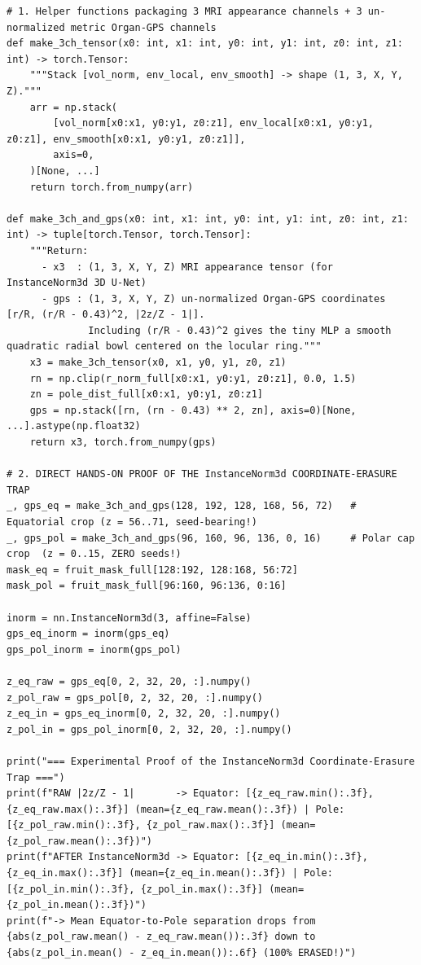 \documentclass[10pt,a4paper]{article}
\begin{document}
\begin{codebox}
\begin{lstlisting}[style=pybmed]
# 1. Helper functions packaging 3 MRI appearance channels + 3 un-normalized metric Organ-GPS channels
def make_3ch_tensor(x0: int, x1: int, y0: int, y1: int, z0: int, z1: int) -> torch.Tensor:
    """Stack [vol_norm, env_local, env_smooth] -> shape (1, 3, X, Y, Z)."""
    arr = np.stack(
        [vol_norm[x0:x1, y0:y1, z0:z1], env_local[x0:x1, y0:y1, z0:z1], env_smooth[x0:x1, y0:y1, z0:z1]],
        axis=0,
    )[None, ...]
    return torch.from_numpy(arr)

def make_3ch_and_gps(x0: int, x1: int, y0: int, y1: int, z0: int, z1: int) -> tuple[torch.Tensor, torch.Tensor]:
    """Return:
      - x3  : (1, 3, X, Y, Z) MRI appearance tensor (for InstanceNorm3d 3D U-Net)
      - gps : (1, 3, X, Y, Z) un-normalized Organ-GPS coordinates [r/R, (r/R - 0.43)^2, |2z/Z - 1|].
              Including (r/R - 0.43)^2 gives the tiny MLP a smooth quadratic radial bowl centered on the locular ring."""
    x3 = make_3ch_tensor(x0, x1, y0, y1, z0, z1)
    rn = np.clip(r_norm_full[x0:x1, y0:y1, z0:z1], 0.0, 1.5)
    zn = pole_dist_full[x0:x1, y0:y1, z0:z1]
    gps = np.stack([rn, (rn - 0.43) ** 2, zn], axis=0)[None, ...].astype(np.float32)
    return x3, torch.from_numpy(gps)

# 2. DIRECT HANDS-ON PROOF OF THE InstanceNorm3d COORDINATE-ERASURE TRAP
_, gps_eq = make_3ch_and_gps(128, 192, 128, 168, 56, 72)   # Equatorial crop (z = 56..71, seed-bearing!)
_, gps_pol = make_3ch_and_gps(96, 160, 96, 136, 0, 16)     # Polar cap crop  (z = 0..15, ZERO seeds!)
mask_eq = fruit_mask_full[128:192, 128:168, 56:72]
mask_pol = fruit_mask_full[96:160, 96:136, 0:16]

inorm = nn.InstanceNorm3d(3, affine=False)
gps_eq_inorm = inorm(gps_eq)
gps_pol_inorm = inorm(gps_pol)

z_eq_raw = gps_eq[0, 2, 32, 20, :].numpy()
z_pol_raw = gps_pol[0, 2, 32, 20, :].numpy()
z_eq_in = gps_eq_inorm[0, 2, 32, 20, :].numpy()
z_pol_in = gps_pol_inorm[0, 2, 32, 20, :].numpy()

print("=== Experimental Proof of the InstanceNorm3d Coordinate-Erasure Trap ===")
print(f"RAW |2z/Z - 1|       -> Equator: [{z_eq_raw.min():.3f}, {z_eq_raw.max():.3f}] (mean={z_eq_raw.mean():.3f}) | Pole: [{z_pol_raw.min():.3f}, {z_pol_raw.max():.3f}] (mean={z_pol_raw.mean():.3f})")
print(f"AFTER InstanceNorm3d -> Equator: [{z_eq_in.min():.3f}, {z_eq_in.max():.3f}] (mean={z_eq_in.mean():.3f}) | Pole: [{z_pol_in.min():.3f}, {z_pol_in.max():.3f}] (mean={z_pol_in.mean():.3f})")
print(f"-> Mean Equator-to-Pole separation drops from {abs(z_pol_raw.mean() - z_eq_raw.mean()):.3f} down to {abs(z_pol_in.mean() - z_eq_in.mean()):.6f} (100% ERASED!)")


\end{lstlisting}
\end{codebox}
\end{document}
